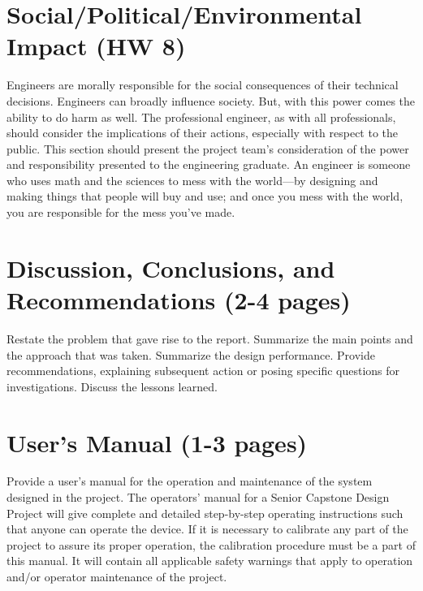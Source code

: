 \documentclass[12pt]{article}
\begin{document}
\section{Social/Political/Environmental Impact (HW 8)}
Engineers are morally responsible for the social consequences of their technical decisions. Engineers can broadly influence society. But, with this power comes the ability to do harm as well. The professional engineer, as with all professionals, should consider the implications of their actions, especially with respect to the public. This section should present the project team's consideration of the power and responsibility presented to the engineering graduate. An engineer is someone who uses math and the sciences to mess with the world—by designing and making things that people will buy and use; and once you mess with the world, you are responsible for the mess you’ve made.

\section{Discussion, Conclusions, and Recommendations (2-4 pages)}
Restate the problem that gave rise to the report. Summarize the main points and the approach that was taken. Summarize the design performance. Provide recommendations, explaining subsequent action or posing specific questions for investigations. Discuss the lessons learned.

\section{User’s Manual (1-3 pages)}
Provide a user’s manual for the operation and maintenance of the system designed in the project. The operators' manual for a Senior Capstone Design Project will give complete and detailed step-by-step operating instructions such that anyone can operate the device. If it is necessary to calibrate any part of the project to assure its proper operation, the calibration procedure must be a part of this manual. It will contain all applicable safety warnings that apply to operation and/or operator maintenance of the project.
\end{document}
